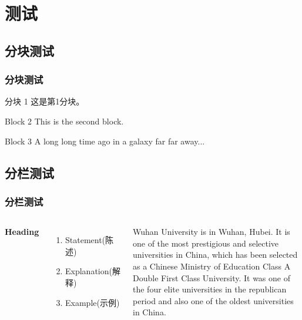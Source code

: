 \documentclass[presentation,aspectratio=1610]{beamer}
\begin{document}
\section{测试} %

\subsection{分块测试} %

\begin{frame}
\frametitle{分块测试}
	\begin{block}{分块 1}
	这是第1分块。
	\end{block}

	\begin{block}{Block 2}
	This is the second block.
	\end{block}

	\begin{block}{Block 3}
	A long long time ago in a galaxy far far away...
	\end{block}
\end{frame}


\subsection{分栏测试}

\begin{frame}
\frametitle{分栏测试}
\begin{columns}[c] %

\textbf{Heading}
\begin{enumerate}
\item Statement(陈述)
\item Explanation(解释)
\item Example(示例)
\end{enumerate}

Wuhan University is in Wuhan, Hubei.
It is one of the most prestigious and selective universities in China, which has been selected as a Chinese Ministry of Education Class A Double First Class University.
It was one of the four elite universities in the republican period and also one of the oldest universities in China.

\end{columns}
\end{frame}
\end{document}
